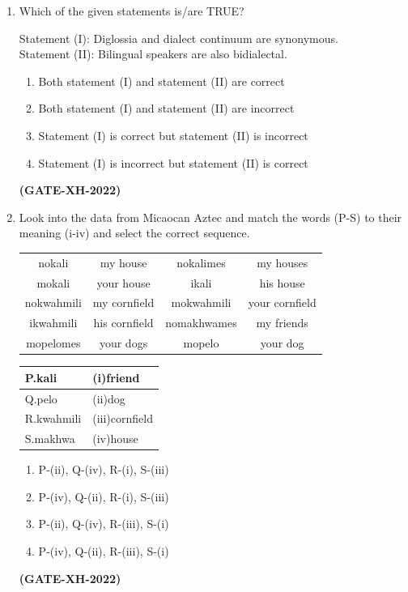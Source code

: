 \documentclass[journal]{IEEEtran}
\begin{document}
\begin{enumerate}
\item Which of the given statements is/are TRUE?  

Statement (I): Diglossia and dialect continuum are synonymous. \\
Statement (II): Bilingual speakers are also bidialectal.  

\begin{enumerate}
\item Both statement (I) and statement (II) are correct  
\item Both statement (I) and statement (II) are incorrect  
\item Statement (I) is correct but statement (II) is incorrect  
\item Statement (I) is incorrect but statement (II) is correct  
\end{enumerate}
\hfill\textbf{(GATE-XH-2022)}

\item Look into the data from Micaocan Aztec and match the words (P-S) to their meaning (i-iv) and select the correct sequence.\\
\begin{tabular}{c c c c}
nokali& my house& nokalimes &my houses\\
mokali& your house& ikali& his house\\
nokwahmili& my cornfield& mokwahmili &your cornfield\\
ikwahmili& his cornfield& nomakhwames& my friends\\
mopelomes &your dogs& mopelo& your dog\\
\end{tabular}
\begin{tabular}{|p{2cm}|p{2cm}|}
\hline
   P.kali  & (i)friend \\
   \hline
   Q.pelo  & (ii)dog\\
   \hline
   R.kwahmili &(iii)cornfield\\
   \hline
   S.makhwa & (iv)house\\
   \hline
\end{tabular}
\begin{multicols}{2}
\begin{enumerate}
\item P-(ii), Q-(iv), R-(i), S-(iii)  
\item P-(iv), Q-(ii), R-(i), S-(iii)  
\item P-(ii), Q-(iv), R-(iii), S-(i)  
\item P-(iv), Q-(ii), R-(iii), S-(i)  
\end{enumerate}
\end{multicols}
\hfill\textbf{(GATE-XH-2022)}


\end{enumerate}
\end{document}
